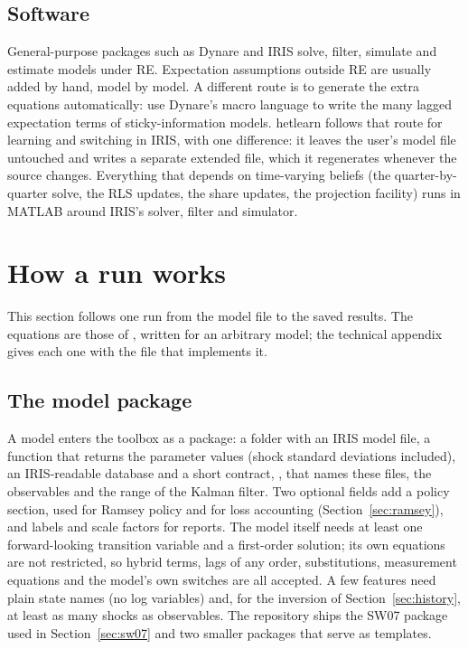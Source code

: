 \documentclass[pdflatex,sn-basic]{sn-jnl}
\DeclareRobustCommand{\code}[1]{\texttt{\detokenize{#1}}}
\begin{document}
\subsection{Software}\label{sec:software}

General-purpose packages such as Dynare \citep{adjemian2011} and IRIS \citep{iris} solve,
filter, simulate and estimate models under RE. Expectation assumptions outside RE are usually
added by hand, model by model. A different route is to generate the extra equations
automatically: \citet{verona2014} use Dynare's macro language to write the many lagged
expectation terms of sticky-information models. hetlearn follows that route for learning and
switching in IRIS, with one difference: it leaves the user's model file untouched and writes a
separate extended file, which it regenerates whenever the source changes. Everything that
depends on time-varying beliefs (the quarter-by-quarter solve, the RLS updates, the share
updates, the projection facility) runs in MATLAB around IRIS's solver, filter and simulator.

\section{How a run works}\label{sec:design}

This section follows one run from the model file to the saved results. The equations are
those of \citet{ozden2025}, written for an arbitrary model; the technical appendix gives each
one with the file that implements it.

\subsection{The model package}\label{sec:package}

A model enters the toolbox as a package: a folder with an IRIS model file, a function that
returns the parameter values (shock standard deviations included), an IRIS-readable database and
a short contract, \code{model_spec.m}, that names these files, the observables and the range of
the Kalman filter. Two optional fields add a policy section, used for Ramsey policy and for loss
accounting (Section~\ref{sec:ramsey}), and labels and scale factors for reports. The model itself
needs at least one forward-looking transition variable and a first-order solution; its own
equations are not restricted, so hybrid terms, lags of any order,
substitutions, measurement equations and the model's own \code{!if} switches are all accepted. A
few features need plain state names (no log variables) and, for the inversion of
Section~\ref{sec:history}, at least as many shocks as observables. The repository ships the SW07
package used in Section~\ref{sec:sw07} and two smaller packages that serve as templates.
\end{document}
